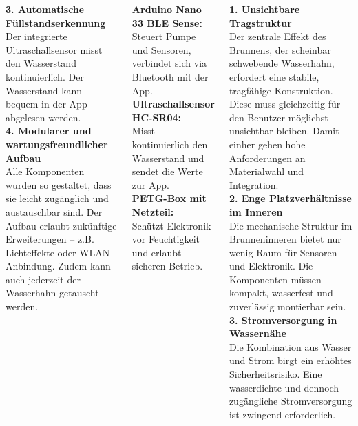 \documentclass[25pt,a0paper, portrait]{tikzposter}
\begin{document}
\begin{columns}
{{				\textbf{3. Automatische Füllstandserkennung} \\
				Der integrierte Ultraschallsensor misst den Wasserstand kontinuierlich. Der Wasserstand kann bequem in der App abgelesen werden. \\[1em]
				
				\textbf{4. Modularer und wartungsfreundlicher Aufbau} \\
				Alle Komponenten wurden so gestaltet, dass sie leicht zugänglich und austauschbar sind. Der Aufbau erlaubt zukünftige Erweiterungen – z.B. Lichteffekte oder WLAN-Anbindung. Zudem kann auch jederzeit der Wasserhahn getauscht werden.
				
			}
			
			{
				\textbf{Arduino Nano 33 BLE Sense:} \\
				Steuert Pumpe und Sensoren, verbindet sich via Bluetooth mit der App.\\[-1em]
				
				\textbf{Ultraschallsensor HC-SR04:} \\
				Misst kontinuierlich den Wasserstand und sendet die Werte zur App.\\[-1em]
				
				\textbf{PETG-Box mit Netzteil:} \\
				Schützt Elektronik vor Feuchtigkeit und erlaubt sicheren Betrieb.
			}
		}
		
		
		{
			{
				\textbf{1. Unsichtbare Tragstruktur} \\
				Der zentrale Effekt des Brunnens, der scheinbar schwebende Wasserhahn, erfordert eine stabile, tragfähige Konstruktion. Diese muss gleichzeitig für den Benutzer möglichst unsichtbar bleiben. Damit einher gehen hohe Anforderungen an Materialwahl und Integration. \\[1em]
				
				\textbf{2. Enge Platzverhältnisse im Inneren} \\
				Die mechanische Struktur im Brunneninneren bietet nur wenig Raum für Sensoren und Elektronik. Die Komponenten müssen kompakt, wasserfest und zuverlässig montierbar sein. \\[1em]
				
				\textbf{3. Stromversorgung in Wassernähe} \\
				Die Kombination aus Wasser und Strom birgt ein erhöhtes Sicherheitsrisiko. Eine wasserdichte und dennoch zugängliche Stromversorgung ist zwingend erforderlich. \\[1em]
				
}}
\end{columns}
\end{document}

